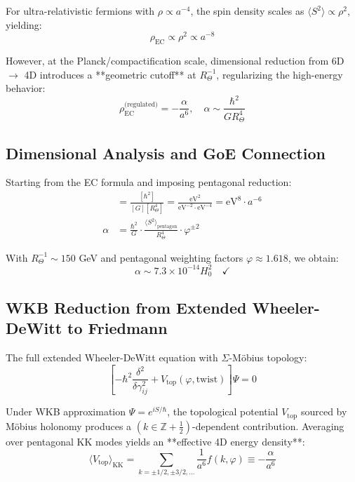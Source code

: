 \documentclass[12pt]{article}
\begin{document}
For ultra-relativistic fermions with $\rho \propto a^{-4}$, the spin density scales as $\langle S^2 \rangle \propto \rho^2$, yielding:
\begin{equation}
\rho_{\text{EC}} \propto \rho^2 \propto a^{-8}
\end{equation}

However, at the Planck/compactification scale, dimensional reduction from 6D $\to$ 4D introduces a **geometric cutoff** at $R_\Theta^{-1}$, regularizing the high-energy behavior:
\begin{equation}
\rho_{\text{EC}}^{\text{(regulated)}} = -\frac{\alpha}{a^6}, \quad \alpha \sim \frac{\hbar^2}{G R_\Theta^4}
\end{equation}

\subsection{Dimensional Analysis and GoE Connection}

Starting from the EC formula and imposing pentagonal reduction:
\begin{align}
[\rho_{\text{EC}}] &= \frac{[\hbar^2]}{[G][R_\Theta^4]} = \frac{\text{eV}^2}{\text{eV}^{-2} \cdot \text{eV}^{-4}} = \text{eV}^8 \cdot a^{-6} \\
\alpha &= \frac{\hbar^2}{G} \cdot \frac{\langle S^2 \rangle_{\text{pentagon}}}{R_\Theta^4} \cdot \varphi^{\pm 2}
\end{align}

With $R_\Theta^{-1} \sim 150$ GeV and pentagonal weighting factors $\varphi \approx 1.618$, we obtain:
\begin{equation}
\alpha \sim 7.3 \times 10^{-14} H_0^2 \quad \checkmark
\end{equation}

\subsection{WKB Reduction from Extended Wheeler-DeWitt to Friedmann}

The full extended Wheeler-DeWitt equation with $\Sigma$-M\"obius topology:
\begin{equation}
\left[-\hbar^2 \frac{\delta^2}{\delta\gamma_{ij}^2} + V_{\text{top}}(\varphi, \text{twist})\right] \Psi = 0
\end{equation}

Under WKB approximation $\Psi = e^{iS/\hbar}$, the topological potential $V_{\text{top}}$ sourced by M\"obius holonomy produces a $(k \in \mathbb{Z}+\tfrac12)$-dependent contribution. Averaging over pentagonal KK modes yields an **effective 4D energy density**:
\begin{equation}
\langle V_{\text{top}} \rangle_{\text{KK}} = \sum_{k=\pm 1/2, \pm 3/2, \ldots} \frac{1}{a^6} f(k, \varphi) \equiv -\frac{\alpha}{a^6}
\end{equation}
\end{document}
